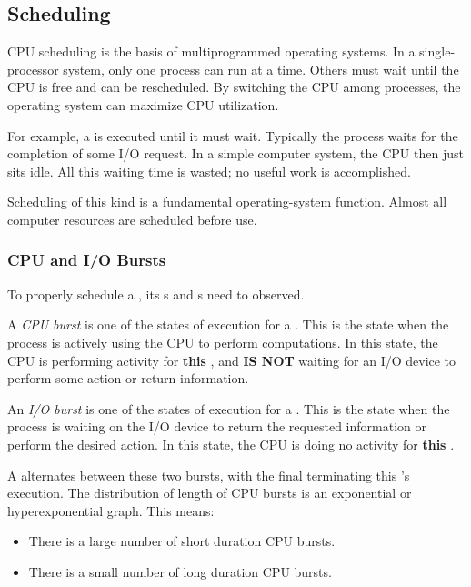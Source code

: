 \subsection{Scheduling}\label{subsec:Scheduling}
CPU scheduling is the basis of multiprogrammed operating systems.
In a single-processor system, only one process can run at a time.
Others must wait until the CPU is free and can be rescheduled.
By switching the CPU among processes, the operating system can maximize CPU utilization.

For example, a  is executed until it must wait.
Typically the process waits for the completion of some I/O request.
In a simple computer system, the CPU then just sits idle.
All this waiting time is wasted; no useful work is accomplished.

Scheduling of this kind is a fundamental operating-system function.
Almost all computer resources are scheduled before use.

\subsubsection{CPU and I/O Bursts}\label{subsubsec:CPU_IO_Bursts}
To properly schedule a , its s and s need to observed.

\begin{definition}\label{def:CPU_Burst}
  A \emph{CPU burst} is one of the states of execution for a .
  This is the state when the process is actively using the CPU to perform computations.
  In this state, the CPU is performing activity for \textbf{this} , and \textbf{IS NOT} waiting for an I/O device to perform some action or return information.
\end{definition}

\begin{definition}[I/O Burst]\label{def:I/O_Burst}
  An \emph{I/O burst} is one of the states of execution for a .
  This is the state when the process is waiting on the I/O device to return the requested information or perform the desired action.
  In this state, the CPU is doing no activity for \textbf{this} .
\end{definition}

A  alternates between these two bursts, with the final  terminating this 's execution.
The distribution of length of CPU bursts is an exponential or hyperexponential graph.
This means:
\begin{itemize}[noitemsep]
\item There is a large number of short duration CPU bursts.
\item There is a small number of long duration CPU bursts.
\end{itemize}


